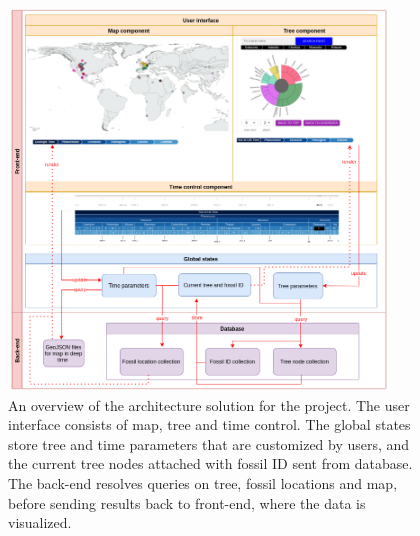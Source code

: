 \documentclass[11pt, a4paper,oneside,chapterprefix=false]{scrbook}
\begin{document}
\begin{figure}[h]
	\centering
	\includegraphics[width=0.9\textwidth]{figures/technical_solution/architecture}
	\caption{An overview of the architecture solution for the project. The user interface consists of map, tree and time control. The global states store tree and time parameters that are customized by users, and the current tree nodes attached with fossil ID sent from database. The back-end resolves queries on tree, fossil locations and map, before sending results back to front-end, where the data is visualized. }
	\label{fig:architecture}
\end{figure}
\end{document}
